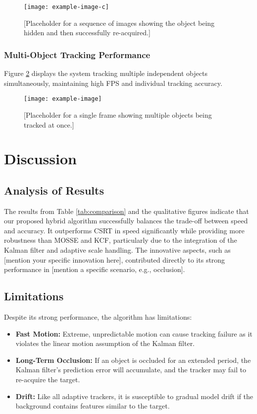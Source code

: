 \documentclass[12pt, a4paper]{report}
\begin{document}
\begin{figure}[H]
    \centering
    \texttt{[image: example-image-c]}
    \caption{[Placeholder for a sequence of images showing the object being hidden and then successfully re-acquired.]}
    \label{fig:occlusion}
\end{figure}

\subsection{Multi-Object Tracking Performance}
Figure \ref{fig:multi} displays the system tracking multiple independent objects simultaneously, maintaining high FPS and individual tracking accuracy.

\begin{figure}[H]
    \centering
    \texttt{[image: example-image]}
    \caption{[Placeholder for a single frame showing multiple objects being tracked at once.]}
    \label{fig:multi}
\end{figure}



\chapter{Discussion}

\section{Analysis of Results}
The results from Table \ref{tab:comparison} and the qualitative figures indicate that our proposed hybrid algorithm successfully balances the trade-off between speed and accuracy. It outperforms CSRT in speed significantly while providing more robustness than MOSSE and KCF, particularly due to the integration of the Kalman filter and adaptive scale handling. The innovative aspects, such as [mention your specific innovation here], contributed directly to its strong performance in [mention a specific scenario, e.g., occlusion].

\section{Limitations}
Despite its strong performance, the algorithm has limitations:
\begin{itemize}
    \item \textbf{Fast Motion:} Extreme, unpredictable motion can cause tracking failure as it violates the linear motion assumption of the Kalman filter.
    \item \textbf{Long-Term Occlusion:} If an object is occluded for an extended period, the Kalman filter's prediction error will accumulate, and the tracker may fail to re-acquire the target.
    \item \textbf{Drift:} Like all adaptive trackers, it is susceptible to gradual model drift if the background contains features similar to the target.
\end{itemize}
\end{document}
